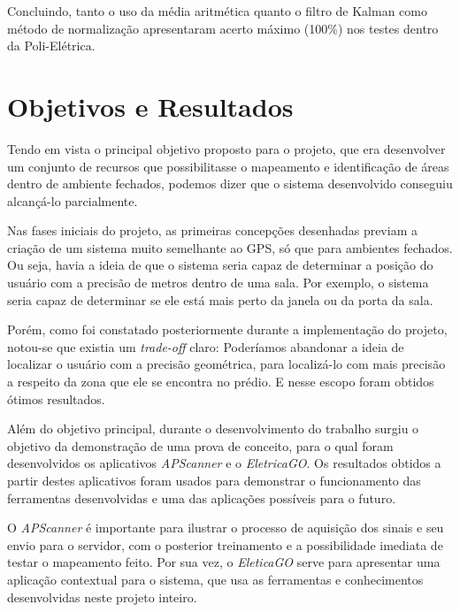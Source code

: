 Concluindo, tanto o uso da média aritmética quanto o filtro de Kalman como método de normalização apresentaram acerto máximo (100\%) nos testes dentro da Poli-Elétrica.


\section{Objetivos e Resultados}
Tendo em vista o principal objetivo proposto para o projeto, que era desenvolver um conjunto de recursos que possibilitasse o mapeamento e identificação de áreas dentro de ambiente fechados, podemos dizer que o sistema desenvolvido conseguiu alcançá-lo parcialmente.\par
Nas fases iniciais do projeto, as primeiras concepções desenhadas previam a criação de um sistema muito semelhante ao GPS, só que para ambientes fechados. Ou seja, havia a ideia de que o sistema seria capaz de determinar a posição do usuário com a precisão de metros dentro de uma sala. Por exemplo, o sistema seria capaz de determinar se ele está mais perto da janela ou da porta da sala.\par
Porém, como foi constatado posteriormente durante a implementação do projeto, notou-se que existia um \textit{trade-off} claro: Poderíamos abandonar a ideia de localizar o usuário com a precisão geométrica, para localizá-lo com mais precisão a respeito da zona que ele se encontra no prédio. E nesse escopo foram obtidos ótimos resultados.\par
Além do objetivo principal, durante o desenvolvimento do trabalho surgiu o objetivo da demonstração de uma prova de conceito, para o qual foram desenvolvidos os aplicativos \textit{APScanner} e o \textit{EletricaGO}. Os resultados obtidos a partir destes aplicativos foram usados para demonstrar o funcionamento das ferramentas desenvolvidas e uma das aplicações possíveis para o futuro.\par
O \textit{APScanner} é importante para ilustrar o processo de aquisição dos sinais e seu envio para o servidor, com o posterior treinamento e a possibilidade imediata de testar o mapeamento feito. Por sua vez, o \textit{EleticaGO} serve para apresentar uma aplicação contextual para o sistema, que usa as ferramentas e conhecimentos desenvolvidas neste projeto inteiro. \par



